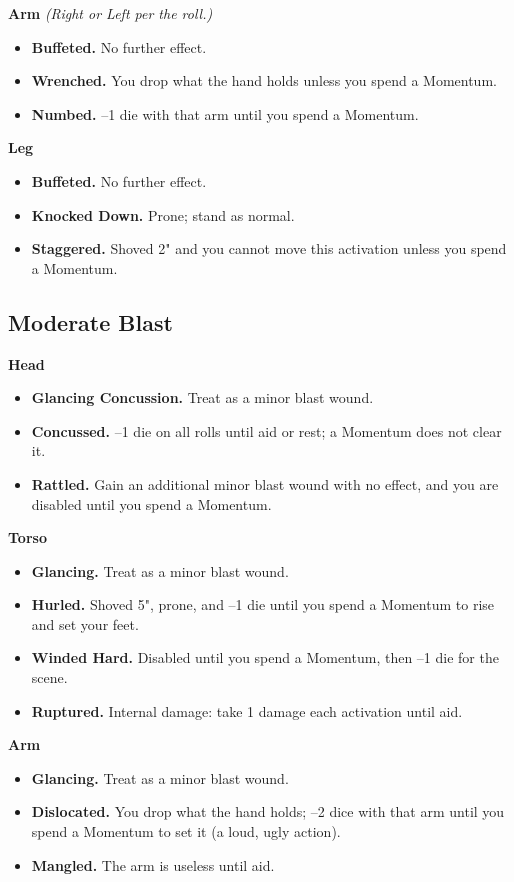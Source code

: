 \textbf{Arm} \textit{(Right or Left per the roll.)}
\begin{itemize}
    \item[1--2] \textbf{Buffeted.} No further effect.
    \item[3] \textbf{Wrenched.} You drop what the hand holds unless you spend a Momentum.
    \item[4] \textbf{Numbed.} --1 die with that arm until you spend a Momentum.
\end{itemize}

\textbf{Leg}
\begin{itemize}
    \item[1--2] \textbf{Buffeted.} No further effect.
    \item[3] \textbf{Knocked Down.} Prone; stand as normal.
    \item[4] \textbf{Staggered.} Shoved 2" and you cannot move this activation unless you spend a Momentum.
\end{itemize}

\subsection{Moderate Blast}

\textbf{Head}
\begin{itemize}
    \item[1] \textbf{Glancing Concussion.} Treat as a minor blast wound.
    \item[2] \textbf{Concussed.} --1 die on all rolls until aid or rest; a Momentum does not clear it.
    \item[3--4] \textbf{Rattled.} Gain an additional minor blast wound with no effect, and you are disabled until you spend a Momentum.
\end{itemize}

\textbf{Torso}
\begin{itemize}
    \item[1] \textbf{Glancing.} Treat as a minor blast wound.
    \item[2] \textbf{Hurled.} Shoved 5", prone, and --1 die until you spend a Momentum to rise and set your feet.
    \item[3] \textbf{Winded Hard.} Disabled until you spend a Momentum, then --1 die for the scene.
    \item[4] \textbf{Ruptured.} Internal damage: take 1 damage each activation until aid.
\end{itemize}

\textbf{Arm}
\begin{itemize}
    \item[1] \textbf{Glancing.} Treat as a minor blast wound.
    \item[2] \textbf{Dislocated.} You drop what the hand holds; --2 dice with that arm until you spend a Momentum to set it (a loud, ugly action).
    \item[3--4] \textbf{Mangled.} The arm is useless until aid.
\end{itemize}


